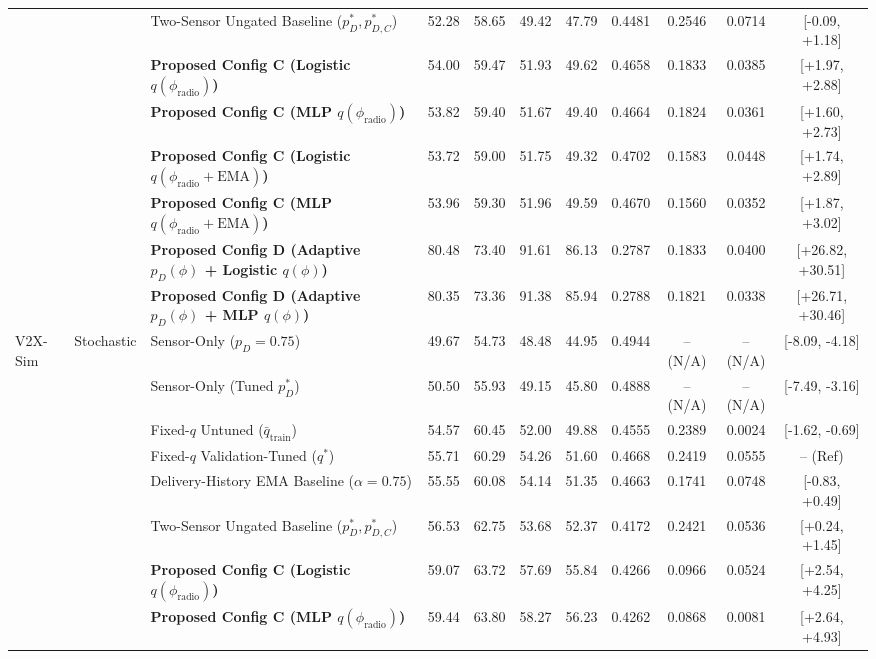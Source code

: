 \begin{table}[!t]
\begin{tabular}{lllcccccccc}
 &  & Two-Sensor Ungated Baseline ($p_D^*, p_{D,C}^*$) & 52.28 & 58.65 & 49.42 & 47.79 & 0.4481 & 0.2546 & 0.0714 & [-0.09, +1.18] \\
 &  & \textbf{Proposed Config C (Logistic $q(\phi_{\text{radio}})$)} & 54.00 & 59.47 & 51.93 & 49.62 & 0.4658 & 0.1833 & 0.0385 & [+1.97, +2.88] \\
 &  & \textbf{Proposed Config C (MLP $q(\phi_{\text{radio}})$)} & 53.82 & 59.40 & 51.67 & 49.40 & 0.4664 & 0.1824 & 0.0361 & [+1.60, +2.73] \\
 &  & \textbf{Proposed Config C (Logistic $q(\phi_{\text{radio}}+\text{EMA})$)} & 53.72 & 59.00 & 51.75 & 49.32 & 0.4702 & 0.1583 & 0.0448 & [+1.74, +2.89] \\
 &  & \textbf{Proposed Config C (MLP $q(\phi_{\text{radio}}+\text{EMA})$)} & 53.96 & 59.30 & 51.96 & 49.59 & 0.4670 & 0.1560 & 0.0352 & [+1.87, +3.02] \\
 &  & \textbf{Proposed Config D (Adaptive $p_D(\phi)$ + Logistic $q(\phi)$)} & 80.48 & 73.40 & 91.61 & 86.13 & 0.2787 & 0.1833 & 0.0400 & [+26.82, +30.51] \\
 &  & \textbf{Proposed Config D (Adaptive $p_D(\phi)$ + MLP $q(\phi)$)} & 80.35 & 73.36 & 91.38 & 85.94 & 0.2788 & 0.1821 & 0.0338 & [+26.71, +30.46] \\
\midrule
V2X-Sim & Stochastic & Sensor-Only ($p_D=0.75$) & 49.67 & 54.73 & 48.48 & 44.95 & 0.4944 & -- (N/A) & -- (N/A) & [-8.09, -4.18] \\
 &  & Sensor-Only (Tuned $p_D^*$) & 50.50 & 55.93 & 49.15 & 45.80 & 0.4888 & -- (N/A) & -- (N/A) & [-7.49, -3.16] \\
 &  & Fixed-$q$ Untuned ($\bar{q}_{\text{train}}$) & 54.57 & 60.45 & 52.00 & 49.88 & 0.4555 & 0.2389 & 0.0024 & [-1.62, -0.69] \\
 &  & Fixed-$q$ Validation-Tuned ($q^*$) & 55.71 & 60.29 & 54.26 & 51.60 & 0.4668 & 0.2419 & 0.0555 & -- (Ref) \\
 &  & Delivery-History EMA Baseline ($\alpha=0.75$) & 55.55 & 60.08 & 54.14 & 51.35 & 0.4663 & 0.1741 & 0.0748 & [-0.83, +0.49] \\
 &  & Two-Sensor Ungated Baseline ($p_D^*, p_{D,C}^*$) & 56.53 & 62.75 & 53.68 & 52.37 & 0.4172 & 0.2421 & 0.0536 & [+0.24, +1.45] \\
 &  & \textbf{Proposed Config C (Logistic $q(\phi_{\text{radio}})$)} & 59.07 & 63.72 & 57.69 & 55.84 & 0.4266 & 0.0966 & 0.0524 & [+2.54, +4.25] \\
 &  & \textbf{Proposed Config C (MLP $q(\phi_{\text{radio}})$)} & 59.44 & 63.80 & 58.27 & 56.23 & 0.4262 & 0.0868 & 0.0081 & [+2.64, +4.93] \\

\end{tabular}
\end{table}
